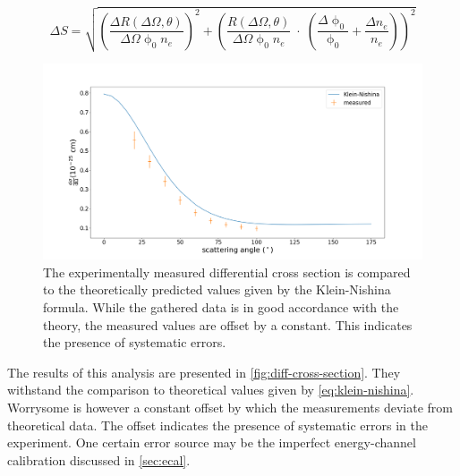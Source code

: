 \begin{equation}
\label{eq:cross-section-error}
	\Delta S = \sqrt{ \left(\frac{\Delta R(\Delta\Omega,\theta)}{\Delta\Omega\upphi_0 n_e} \right)^2 + \left(\frac{R(\Delta\Omega,\theta)}{\Delta\Omega\upphi_0 n_e}\;\cdot\;(\frac{\Delta\upphi_0}{\upphi_0} + \frac{\Delta n_e}{n_e} ) \right)^2 }
\end{equation}

\begin{figure}
	\centering
	\includegraphics[width=1.0\textwidth]{./fig/differential-cross-section.png}
	\caption{The experimentally measured differential cross section is compared
	to the theoretically predicted values given by the Klein-Nishina formula.
	While the gathered data is in good accordance with the theory, the measured
	values are offset by a constant. This indicates the presence of systematic 
	errors.}
	\label{fig:diff-cross-section}
\end{figure}

The results of this analysis are presented in \autoref{fig:diff-cross-section}. They
withstand the comparison to theoretical values given by \autoref{eq:klein-nishina}. 
Worrysome is however a constant offset by which the measurements deviate from 
theoretical data. The offset indicates the presence of systematic errors in the
experiment. One certain error source may be the imperfect energy-channel calibration
discussed in \autoref{sec:ecal}.
